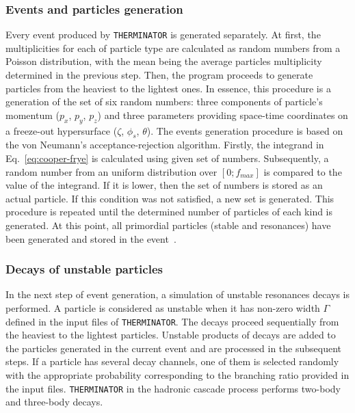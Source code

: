     \subsubsection{Events and particles generation}
      Every event produced by \verb|THERMINATOR| is generated separately.
      At first, the multiplicities for each of particle type are calculated as random numbers from a Poisson distribution, with the mean being the average particles multiplicity determined in the previous step.
      Then, the program proceeds to generate particles from the heaviest to the lightest ones.
      In essence, this procedure is a generation of the set of six random numbers: three components of particle's momentum ($p_x$, $p_y$, $p_z$) and three parameters providing space-time coordinates on a freeze-out hypersurface ($\zeta$, $\phi_s$, $\theta$).
      The events generation procedure is based on the von Neumann's acceptance-rejection algorithm.
      Firstly, the integrand in Eq.~\ref{eq:cooper-frye} is calculated using given set of numbers.
      Subsequently, a random number from an uniform distribution over $[0;f_{max}]$ is compared to the value of the integrand.
      If it is lower, then the set of numbers is stored as an actual particle.
      If this condition was not satisfied, a new set is generated.
      This procedure is repeated until the determined number of particles of each kind is generated.
      At this point, all primordial particles (stable and resonances) have been generated and stored in the event~\cite{therminator}.
    \subsubsection{Decays of unstable particles}
      In the next step of event generation, a simulation of unstable resonances decays is performed.
      A particle is considered as unstable when it has non-zero width $\Gamma$ defined in the input files of \verb|THERMINATOR|.
      The decays proceed sequentially from the heaviest to the lightest particles.
      Unstable products of decays are added to the particles generated in the current event and are processed in the subsequent steps.
      If a particle has several decay channels, one of them is selected randomly with the appropriate probability corresponding to the branching ratio provided in the input files.
      \verb|THERMINATOR| in the hadronic cascade process performs two-body and three-body decays.


